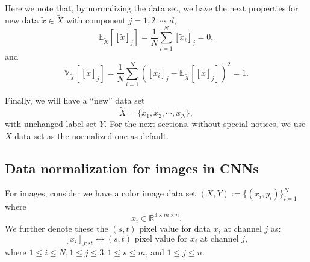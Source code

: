 Here we note that, by normalizing the data set, we have the next properties 
for new data $\tilde x \in \tilde X$ with component $j = 1,2,\cdots,d$,
\begin{equation}\label{key}
\mathbb{E}_{\tilde X}[[\tilde x]_j] = \frac{1}{N} \sum_{i=1}^N [\tilde x_i]_j = 0,
\end{equation}
and 
\begin{equation}\label{key}
\mathbb{V}_{\tilde X}[[\tilde x]_j] = \frac{1}{N} \sum_{i=1}^N ([\tilde x_i]_j - \mathbb{E}_{\tilde X}[[\tilde x]_j] )^2 = 1.
\end{equation}

Finally, we will have a ``new'' data set 
\begin{equation}\label{key}
\tilde X = \{\tilde x_1, \tilde x_2, \cdots, \tilde x_N \},
\end{equation}
with unchanged label set $Y$. For the next sections, without special notices, we use $X$ data set
as the normalized one as default. 


\subsection{Data normalization for images in CNNs}
For images, consider we have a color image data set $(X,Y) := \{(x_i, y_i)\}_{i=1}^N$ where
\begin{equation}\label{key}
x_i \in \mathbb{R}^{3 \times m\times n}.
\end{equation}
We further denote these the $(s,t)$ pixel value for data $x_i$ at channel $j$ as:
\begin{equation}\label{key}
[x_i]_{j;st} \longleftrightarrow (s,t) \text{ pixel value for } x_i \text{ at channel } j,
\end{equation}
where $1\le i \le N, 1\le j\le 3, 1\le s \le m$, and  $1\le j\le n$.

